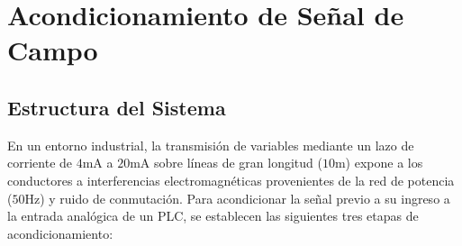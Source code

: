 \chapter{Acondicionamiento de Señal de Campo}

\section{Estructura del Sistema}
En un entorno industrial, la transmisión de variables mediante un lazo de corriente de $4 \unit{\milli\ampere}$ a
$20 \unit{\milli\ampere}$ sobre líneas de gran longitud ($10 \unit{\meter}$) expone a los conductores a
interferencias electromagnéticas provenientes de la red de potencia ($50 \unit{\hertz}$) y ruido de conmutación.
Para acondicionar la señal previo a su ingreso a la entrada analógica de un PLC, se establecen las siguientes tres
etapas de acondicionamiento:
